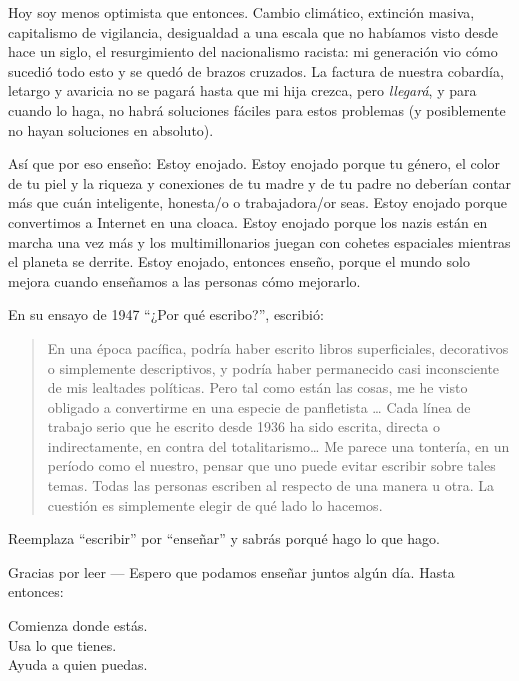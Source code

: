 Hoy soy menos optimista que entonces.
Cambio climático,
extinción masiva,
capitalismo de vigilancia,
desigualdad a una escala que no habíamos visto desde hace un siglo,
el resurgimiento del nacionalismo racista:
mi generación vio cómo sucedió todo esto y se quedó de brazos cruzados.
La factura de nuestra cobardía, letargo y avaricia no se pagará hasta que mi hija crezca,
pero \emph{llegará},
y para cuando lo haga, no habrá soluciones fáciles para estos problemas
(y posiblemente no hayan soluciones en absoluto).

Así que por eso enseño:
Estoy enojado.
Estoy enojado porque tu género, el color de tu piel y la riqueza y conexiones de tu madre y de tu padre
no deberían contar más que cuán inteligente, honesta/o o trabajadora/or seas.
Estoy enojado porque convertimos a Internet en una cloaca.
Estoy enojado porque los nazis están en marcha una vez más
y los multimillonarios juegan con cohetes espaciales mientras el planeta se derrite.
Estoy enojado,
entonces enseño,
porque el mundo solo mejora cuando enseñamos a las personas cómo mejorarlo.

En su ensayo de 1947 ``¿Por qué escribo?'',
 escribió:

\begin{quote}

  En una época pacífica, podría haber escrito libros superficiales, decorativos o simplemente  descriptivos,
  y podría haber permanecido casi inconsciente de mis lealtades políticas.
  Pero tal como están las cosas, me he visto obligado a convertirme en una especie de panfletista {\ldots}
  Cada línea de trabajo serio que he escrito desde 1936 ha sido escrita,
  directa o indirectamente,
  en contra del totalitarismo{\ldots}
  Me parece una tontería,
  en un período como el nuestro,
  pensar que uno puede evitar escribir sobre tales temas.
  Todas las personas escriben al respecto de una manera u otra.
  La cuestión es simplemente elegir de qué lado lo hacemos.

\end{quote}

\noindent
Reemplaza ``escribir'' por ``enseñar'' y sabrás porqué hago lo que hago.

\vspace{\baselineskip}

\noindent
Gracias por leer --- Espero que podamos enseñar juntos algún día.
Hasta entonces:

\begin{center}

Comienza donde estás. \\
Usa lo que tienes. \\
Ayuda a quien puedas.

\end{center}
